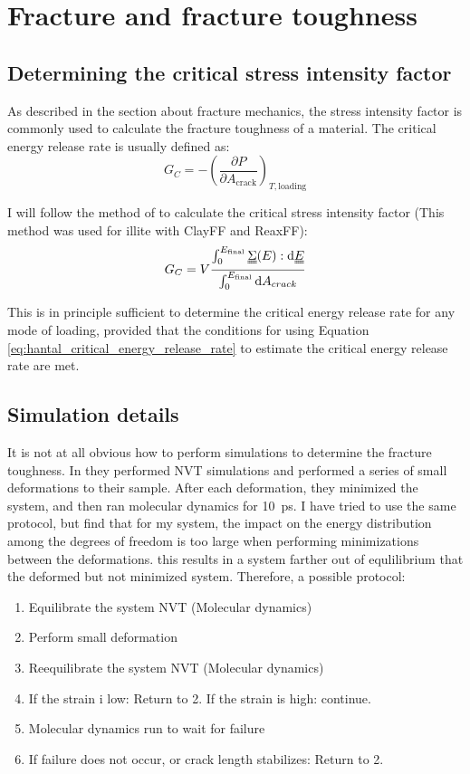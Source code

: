 \section{Fracture and fracture toughness}

\subsection{Determining the critical stress intensity factor}
As described in the section about fracture mechanics, the stress intensity factor is commonly used to calculate the fracture toughness of a material. The critical energy release rate is usually defined as:
\begin{equation}
	G_C = -\left(\frac{\partial P}{\partial A_{\text{crack}}}\right)_{T, \text{loading}}
	\label{eq:def_critical_energy_release_rate}
\end{equation}

I will follow the method of \cite{Hantal2014} to calculate the critical stress intensity factor (This method was used for illite with ClayFF and ReaxFF):\begin{equation}
	G_C = V \frac{\int_0^{E_{\text{final}}}\uuline{\Sigma}(E) : \dd \uuline{E}}{\int_0^{E_{\text{final}}} \dd A_{crack}}
	\label{eq:hantal_critical_energy_release_rate}
\end{equation}

This is in principle sufficient to determine the critical energy release rate for any mode of loading, provided that the conditions for using Equation \ref{eq:hantal_critical_energy_release_rate} to estimate the critical energy release rate are met.

\subsection{Simulation details}
It is not at all obvious how to perform simulations to determine the fracture toughness. In \cite{Hantal2014} they performed NVT simulations and performed a series of small deformations to their sample. After each deformation, they minimized the system, and then ran molecular dynamics for \SI{10}{\pico\second}. I have tried to use the same protocol, but find that for my system, the impact on the energy distribution among the degrees of freedom is too large when performing minimizations between the deformations. this results in a system farther out of equlilibrium that the deformed but not minimized system. Therefore, a possible protocol:

\begin{enumerate}
\item Equilibrate the system NVT (Molecular dynamics)
\item Perform small deformation
\item Reequilibrate the system NVT (Molecular dynamics)
\item If the strain i low: Return to 2. If the strain is high: continue.
\item Molecular dynamics run to wait for failure
\item If failure does not occur, or crack length stabilizes: Return to 2. 
\end{enumerate}

